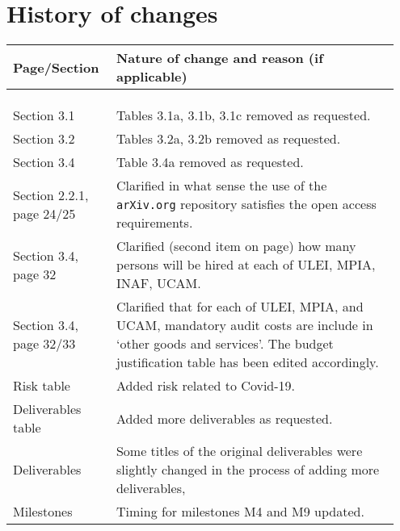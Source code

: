 \section*{History of changes}

\begin{tabular}{|>{\raggedright}p{0.25\linewidth}|>{\raggedright}p{0.7\linewidth}|}
\hline
\textbf{Page/Section} & \textbf{Nature of change and reason (if applicable)} \tabularnewline
\hline
\multicolumn{2}{|l|}{\textbf{Part A}} \tabularnewline
\hline
 & \tabularnewline
\hline
\multicolumn{2}{|l|}{\textbf{Part B}} \tabularnewline
\hline
Section 3.1 & Tables 3.1a, 3.1b, 3.1c removed as requested. \tabularnewline
\hline
Section 3.2 & Tables 3.2a, 3.2b removed as requested. \tabularnewline
\hline
Section 3.4 & Table 3.4a removed as requested. \tabularnewline
\hline
Section 2.2.1, page 24/25 & Clarified in what sense the use of the \texttt{arXiv.org} repository satisfies the open access requirements. \tabularnewline
\hline
Section 3.4, page 32 & Clarified (second item on page) how many persons will be hired at each of ULEI, MPIA, INAF, UCAM. \tabularnewline
\hline
Section 3.4, page 32/33 & Clarified that for each of ULEI, MPIA, and UCAM, mandatory audit costs are include in `other goods and services'. The budget justification table has been edited accordingly. \tabularnewline
\hline
Risk table & Added risk related to Covid-19. \tabularnewline
\hline 
Deliverables table & Added more deliverables as requested. \tabularnewline
\hline
Deliverables & Some titles of the original deliverables were slightly changed in the process of adding more deliverables, \tabularnewline
\hline
Milestones & Timing for milestones M4 and M9 updated. \tabularnewline
\hline
\end{tabular}